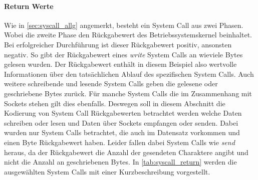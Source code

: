                 \paragraph{Return Werte}

                    Wie in \autoref{sec:syscall_allg} angemerkt, besteht ein System Call aus zwei \glqq Phasen\grqq.
                    Wobei die zweite Phase den Rückgabewert des Betriebssystemskernel beinhaltet.
                    Bei erfolgreicher Durchführung ist dieser Rückgabewert positiv, ansonsten negativ.
                    So gibt der Rückgabewert eines \textit{write} System Calls an wieviele Bytes gelesen wurden.
                    Der Rückgabewert enthält in diesem Beispiel also wertvolle Informationen über den tatsächlichen Ablauf des spezifischen System Calls.
                    Auch weitere schreibende und lesende System Calls geben die gelesene oder geschriebene Bytes zurück.
                    Für manche System Calls die im Zusammenhang mit Sockets stehen gilt dies ebenfalls.
                    Deswegen soll in diesem Abschnitt die Kodierung von System Call Rückgabewerten betrachtet werden welche Daten schreiben oder lesen und Daten über Sockets empfangen oder senden. 
                    Dabei wurden nur System Calls betrachtet, die auch im Datensatz vorkommen und einen Byte Rückgabewert haben.
                    Leider fallen dabei System Calls wie \textit{send} heraus, da der Rückgabewert die Anzahl der gesendeten Charaktere angibt und nicht die Anzahl an geschriebenen Bytes.
                    In \autoref{tab:syscall_return} werden die ausgewählten System Calls mit einer Kurzbeschreibung vorgestellt.

